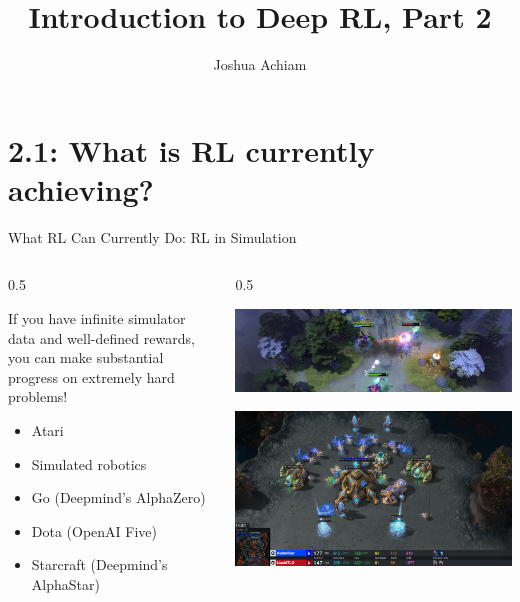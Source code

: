\documentclass[9pt]{beamer}
\newcommand{\twocolumns}[4]{
\begin{columns}
\begin{column}{#1\textwidth}
    #3
\end{column}
\begin{column}{#2\textwidth}
	#4
\end{column}
\end{columns}
}
\begin{document}


\title{Introduction to Deep RL, Part 2}
\author{Joshua Achiam}

\begin{frame}
\titlepage
\end{frame}


\section{2.1: What is RL currently achieving?}

\begin{frame}{What RL Can Currently Do: RL in Simulation}

\twocolumns{0.5}{0.5}{
If you have infinite simulator data and well-defined rewards, you can make substantial progress on extremely hard problems!
\begin{itemize}
\item Atari
\item Simulated robotics
\item Go (Deepmind's AlphaZero)
\item Dota (OpenAI Five)
\item Starcraft (Deepmind's AlphaStar)
\end{itemize}
}{
\includegraphics[width=\textwidth]{p2-five}

\includegraphics[width=\textwidth]{p2-alphastar}
}
\end{frame}
\end{document}
